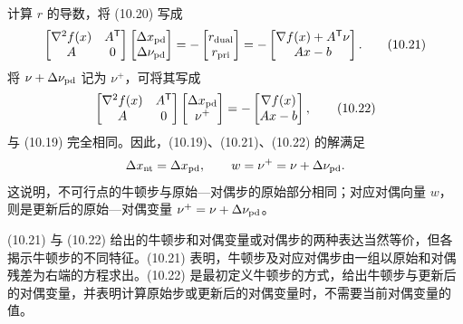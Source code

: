 计算 $r$ 的导数，将 (10.20) 写成
\begin{equation}\begin{bmatrix}\nabla^2f(x)&A^\mathsf T\\A&0\end{bmatrix}\begin{bmatrix}\Delta x_{\rm pd}\\\Delta\nu_{\rm pd}\end{bmatrix}=-\begin{bmatrix}r_{\rm dual}\\r_{\rm pri}\end{bmatrix}=-\begin{bmatrix}\nabla f(x)+A^\mathsf T\nu\\Ax-b\end{bmatrix}.\tag{10.21}\end{equation}
将 $\nu+\Delta\nu_{\rm pd}$ 记为 $\nu^+$，可将其写成
\begin{equation}\begin{bmatrix}\nabla^2f(x)&A^\mathsf T\\A&0\end{bmatrix}\begin{bmatrix}\Delta x_{\rm pd}\\\nu^+\end{bmatrix}=-\begin{bmatrix}\nabla f(x)\\Ax-b\end{bmatrix},\tag{10.22}\end{equation}
与 (10.19) 完全相同。因此，(10.19)、(10.21)、(10.22) 的解满足
\[\Delta x_{\rm nt}=\Delta x_{\rm pd},\qquad w=\nu^+=\nu+\Delta\nu_{\rm pd}.\]
这说明，不可行点的牛顿步与原始—对偶步的原始部分相同；对应对偶向量 $w$，则是更新后的原始—对偶变量 $\nu^+=\nu+\Delta\nu_{\rm pd}$。

(10.21) 与 (10.22) 给出的牛顿步和对偶变量或对偶步的两种表达当然等价，但各揭示牛顿步的不同特征。(10.21) 表明，牛顿步及对应对偶步由一组以原始和对偶残差为右端的方程求出。(10.22) 是最初定义牛顿步的方式，给出牛顿步与更新后的对偶变量，并表明计算原始步或更新后的对偶变量时，不需要当前对偶变量的值。

